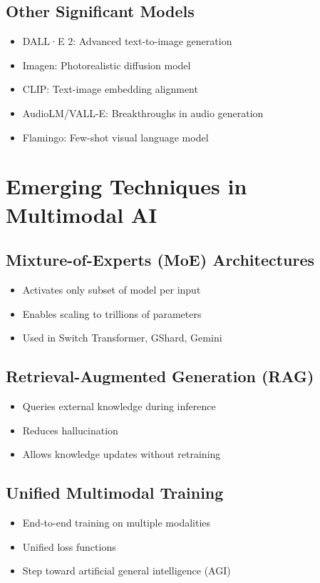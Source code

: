 \documentclass[openany]{book}
\begin{document}
\subsection{Other Significant Models}
\begin{itemize}
    \item DALL·E 2: Advanced text-to-image generation
    \item Imagen: Photorealistic diffusion model
    \item CLIP: Text-image embedding alignment
    \item AudioLM/VALL-E: Breakthroughs in audio generation
    \item Flamingo: Few-shot visual language model
\end{itemize}

\section{Emerging Techniques in Multimodal AI}

\subsection{Mixture-of-Experts (MoE) Architectures}
\begin{itemize}
    \item Activates only subset of model per input
    \item Enables scaling to trillions of parameters
    \item Used in Switch Transformer, GShard, Gemini
\end{itemize}

\subsection{Retrieval-Augmented Generation (RAG)}
\begin{itemize}
    \item Queries external knowledge during inference
    \item Reduces hallucination
    \item Allows knowledge updates without retraining
\end{itemize}

\subsection{Unified Multimodal Training}
\begin{itemize}
    \item End-to-end training on multiple modalities
    \item Unified loss functions
    \item Step toward artificial general intelligence (AGI)
\end{itemize}
\end{document}
